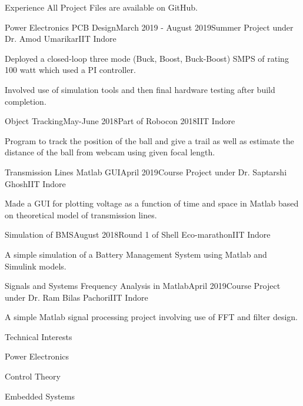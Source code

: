 \documentclass{resume} %
\begin{document}
\begin{rSection}{Experience} 
All Project Files are available on GitHub.

\begin{rSubsection}{Power Electronics PCB Design}{March 2019 - August 2019}{Summer Project under Dr. Amod Umarikar}{IIT Indore}
\item Deployed a closed-loop three mode (Buck, Boost, Buck-Boost) SMPS of rating 100 watt which used a PI controller.
\item Involved use of simulation tools and then final hardware testing after build completion.
\end{rSubsection}

\begin{rSubsection}{Object Tracking}{May-June 2018}{Part of Robocon 2018}{IIT Indore}
\item Program to track the position of the ball and give a trail as well as estimate the distance of the ball from webcam using given focal length.
\end{rSubsection}



\begin{rSubsection}{Transmission Lines Matlab GUI}{April 2019}{Course Project under Dr. Saptarshi Ghosh}{IIT Indore}
\item Made a GUI for plotting voltage as a function of time and space in Matlab based on theoretical model of transmission lines.
\end{rSubsection}

\begin{rSubsection}{Simulation of BMS}{August 2018}{Round 1 of Shell Eco-marathon}{IIT Indore}
\item A simple simulation of a Battery Management System using Matlab and Simulink models.
\end{rSubsection}

\begin{rSubsection}{Signals and Systems Frequency Analysis in Matlab}{April 2019}{Course Project under Dr. Ram Bilas Pachori}{IIT Indore}
\item A simple Matlab signal processing project involving use of FFT and filter design.
\end{rSubsection}

\end{rSection}
\begin{rSection}{Technical Interests}
\begin{rSubsection}{}{}{}{}
\item Power Electronics
\item Control Theory
\item Embedded Systems
\end{rSubsection}
\end{rSection}
\end{document}

